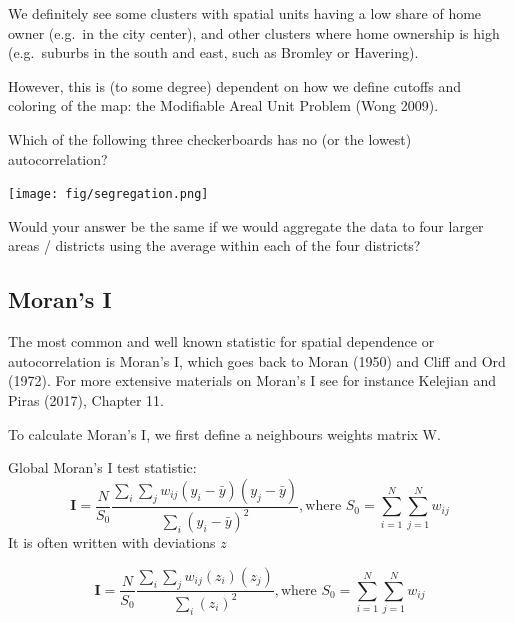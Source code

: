 \documentclass[
  letterpaper,
]{scrbook}
\begin{document}
We definitely see some clusters with spatial units having a low share of
home owner (e.g.~in the city center), and other clusters where home
ownership is high (e.g.~suburbs in the south and east, such as Bromley
or Havering).

However, this is (to some degree) dependent on how we define cutoffs and
coloring of the map: the Modifiable Areal Unit Problem (Wong 2009).

\begin{tcolorbox}[enhanced jigsaw, colframe=quarto-callout-tip-color-frame, coltitle=black, titlerule=0mm, opacitybacktitle=0.6, toprule=.15mm, colbacktitle=quarto-callout-tip-color!10!white, toptitle=1mm, leftrule=.75mm, colback=white, bottomtitle=1mm, opacityback=0, left=2mm, title=\textcolor{quarto-callout-tip-color}{\faLightbulb}\hspace{0.5em}{Question}, breakable, arc=.35mm, rightrule=.15mm, bottomrule=.15mm]

Which of the following three checkerboards has no (or the lowest)
autocorrelation?

\end{tcolorbox}

\texttt{[image: fig/segregation.png]}

Would your answer be the same if we would aggregate the data to four
larger areas / districts using the average within each of the four
districts?

\hypertarget{morans-i}{%
\subsection{Moran's I}\label{morans-i}}

The most common and well known statistic for spatial dependence or
autocorrelation is Moran's I, which goes back to Moran (1950) and Cliff
and Ord (1972). For more extensive materials on Moran's I see for
instance Kelejian and Piras (2017), Chapter 11.

To calculate Moran's I, we first define a neighbours weights matrix W.

Global Moran's I test statistic: \[      
\boldsymbol{\mathbf{I}}  = \frac{N}{S_0}  
\frac{\sum_i\sum_j w_{ij}(y_i-\bar{y})(y_j-\bar{y})}
{\sum_i (y_i-\bar{y})^2}, \text{where } S_0 = \sum_{i=1}^N\sum_{j=1}^N w_{ij}
\] It is often written with deviations \(z\)

\[      
\boldsymbol{\mathbf{I}}  = \frac{N}{S_0}  
\frac{\sum_i\sum_j w_{ij}(z_i)(z_j)}
{\sum_i (z_i)^2}, \text{where } S_0 = \sum_{i=1}^N\sum_{j=1}^N w_{ij}
\]
\end{document}

